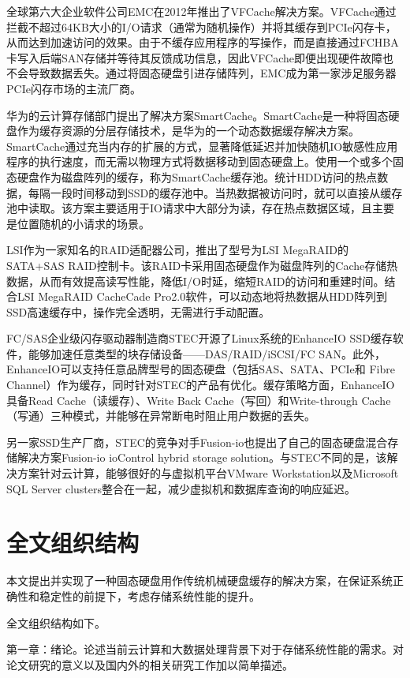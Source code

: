 全球第六大企业软件公司EMC在2012年推出了VFCache解决方案。VFCache通过拦截不超过64KB大小的I/O请求（通常为随机操作）并将其缓存到PCIe闪存卡，从而达到加速访问的效果。由于不缓存应用程序的写操作，而是直接通过FCHBA卡写入后端SAN存储并等待其反馈成功信息，因此VFCache即便出现硬件故障也不会导致数据丢失。通过将固态硬盘引进存储阵列，EMC成为第一家涉足服务器PCIe闪存市场的主流厂商。

华为的云计算存储部门提出了解决方案SmartCache。SmartCache是一种将固态硬盘作为缓存资源的分层存储技术，是华为的一个动态数据缓存解决方案。SmartCache通过充当内存的扩展的方式，显著降低延迟并加快随机IO敏感性应用程序的执行速度，而无需以物理方式将数据移动到固态硬盘上。使用一个或多个固态硬盘作为磁盘阵列的缓存，称为SmartCache缓存池。统计HDD访问的热点数据，每隔一段时间移动到SSD的缓存池中。当热数据被访问时，就可以直接从缓存池中读取。该方案主要适用于IO请求中大部分为读，存在热点数据区域，且主要是位置随机的小请求的场景。

LSI作为一家知名的RAID适配器公司，推出了型号为LSI MegaRAID的SATA+SAS RAID控制卡。该RAID卡采用固态硬盘作为磁盘阵列的Cache存储热数据，从而有效提高读写性能，降低I/O时延，缩短RAID的访问和重建时间。结合LSI MegaRAID CacheCade Pro2.0软件，可以动态地将热数据从HDD阵列到SSD高速缓存中，操作完全透明，无需进行手动配置。

FC/SAS企业级闪存驱动器制造商STEC开源了Linux系统的EnhanceIO SSD缓存软件，能够加速任意类型的块存储设备——DAS/RAID/iSCSI/FC SAN。此外，EnhanceIO可以支持任意品牌型号的固态硬盘（包括SAS、SATA、PCIe和 Fibre Channel）作为缓存，同时针对STEC的产品有优化。缓存策略方面，EnhanceIO具备Read Cache（读缓存）、Write Back Cache（写回）和Write-through Cache（写通）三种模式，并能够在异常断电时阻止用户数据的丢失。

另一家SSD生产厂商，STEC的竞争对手Fusion-io也提出了自己的固态硬盘混合存储解决方案Fusion-io ioControl hybrid storage solution。与STEC不同的是，该解决方案针对云计算，能够很好的与虚拟机平台VMware Workstation以及Microsoft SQL Server clusters整合在一起，减少虚拟机和数据库查询的响应延迟。

\section{全文组织结构}
\label{sec:organization}

本文提出并实现了一种固态硬盘用作传统机械硬盘缓存的解决方案，在保证系统正确性和稳定性的前提下，考虑存储系统性能的提升。

全文组织结构如下。

第一章：绪论。论述当前云计算和大数据处理背景下对于存储系统性能的需求。对论文研究的意义以及国内外的相关研究工作加以简单描述。

